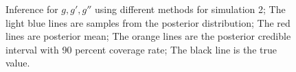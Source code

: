 \documentclass{article}
\begin{document}
\begin{figure}[p]
{    }
    \caption{Inference for $g,g',g''$ using different methods for simulation 2; The light blue lines are samples from the posterior distribution; The red lines are posterior mean; The orange lines are the posterior credible interval with 90 percent coverage rate; The black line is the true value.}
    \label{fig:sim2-1replic}
\end{figure}
\end{document}

